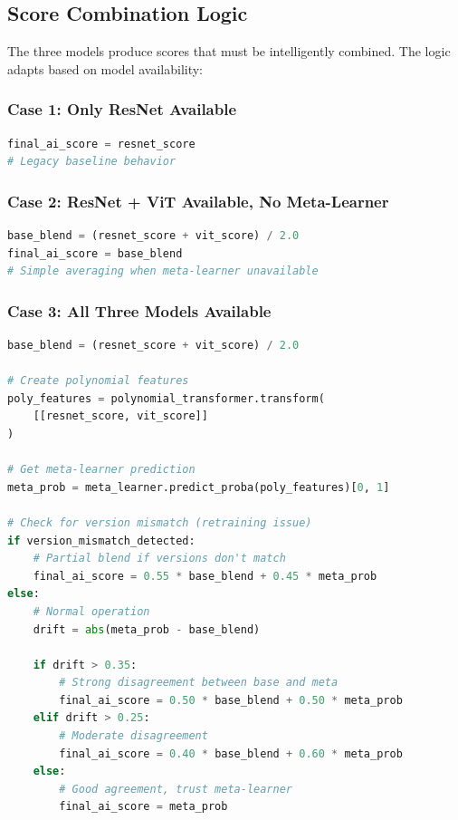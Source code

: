 \documentclass[12pt,a4paper]{book}
\begin{document}
\subsection{Score Combination Logic}

The three models produce scores that must be intelligently combined. The logic adapts based on model availability:

\subsubsection{Case 1: Only ResNet Available}
\begin{lstlisting}[language=Python]
final_ai_score = resnet_score
# Legacy baseline behavior
\end{lstlisting}

\subsubsection{Case 2: ResNet + ViT Available, No Meta-Learner}
\begin{lstlisting}[language=Python]
base_blend = (resnet_score + vit_score) / 2.0
final_ai_score = base_blend
# Simple averaging when meta-learner unavailable
\end{lstlisting}

\subsubsection{Case 3: All Three Models Available}
\begin{lstlisting}[language=Python]
base_blend = (resnet_score + vit_score) / 2.0

# Create polynomial features
poly_features = polynomial_transformer.transform(
    [[resnet_score, vit_score]]
)

# Get meta-learner prediction
meta_prob = meta_learner.predict_proba(poly_features)[0, 1]

# Check for version mismatch (retraining issue)
if version_mismatch_detected:
    # Partial blend if versions don't match
    final_ai_score = 0.55 * base_blend + 0.45 * meta_prob
else:
    # Normal operation
    drift = abs(meta_prob - base_blend)
    
    if drift > 0.35:
        # Strong disagreement between base and meta
        final_ai_score = 0.50 * base_blend + 0.50 * meta_prob
    elif drift > 0.25:
        # Moderate disagreement
        final_ai_score = 0.40 * base_blend + 0.60 * meta_prob
    else:
        # Good agreement, trust meta-learner
        final_ai_score = meta_prob
\end{lstlisting}
\end{document}
